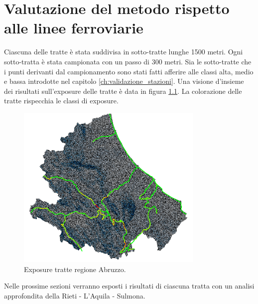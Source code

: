 
\chapter{Valutazione del metodo rispetto alle linee ferroviarie} 
Ciascuna delle tratte è stata suddivisa in sotto-tratte lunghe 1500 metri. Ogni sotto-tratta è stata campionata con un passo di 300 metri. Sia le sotto-tratte che i punti derivanti dal campionamento sono stati fatti afferire alle classi alta, medio e bassa introdotte nel capitolo \ref{ch:validazione_stazioni}.
Una visione d'insieme dei risultati sull'exposure delle tratte è data in figura \ref{tratte_exposure}. La colorazione delle tratte rispecchia le classi di exposure. 

\begin{figure}[h]
	\centering
	\includegraphics[width=0.8\textwidth]{images/completo}
	\caption{Exposure tratte regione Abruzzo.}
	\label{tratte_exposure}
\end{figure}

Nelle prossime sezioni verranno esposti i risultati di ciascuna tratta con un analisi approfondita della Rieti - L'Aquila - Sulmona.

